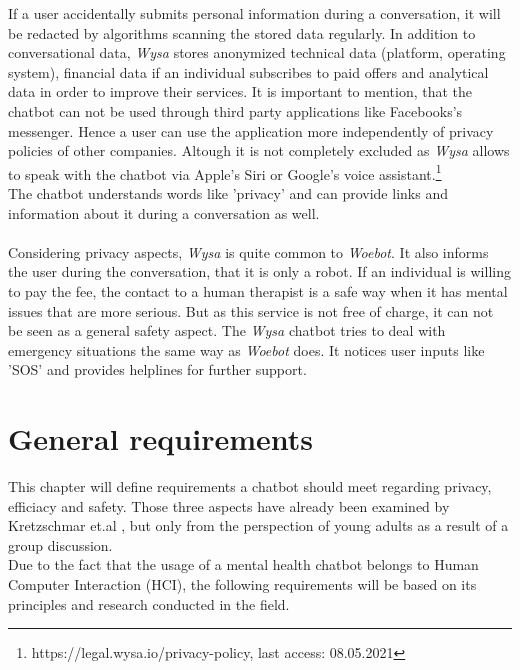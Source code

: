 \documentclass[sigconf, nonacm]{acmart}
\begin{document}
If a user accidentally submits personal information during a conversation, it will be redacted by algorithms scanning the stored data regularly. In addition to conversational data, \emph{Wysa} stores anonymized technical data (platform, operating system), 
financial data if an individual subscribes to paid offers and analytical data in order to improve their services. 
It is important to mention, that the chatbot can not be used through third party applications like Facebooks's messenger. Hence a user can use the application more independently of privacy policies of other companies. Altough it is not completely excluded as \emph{Wysa} allows to speak with the chatbot 
via Apple's Siri or Google's voice assistant.\footnote{https://legal.wysa.io/privacy-policy, last access: 08.05.2021}
\\
The chatbot understands words like 'privacy' and can provide links and information about it during a conversation as well.\cite{Kretzschmar2019}
\\\\
Considering privacy aspects, \emph{Wysa} is quite common to \emph{Woebot}. It also informs the user during the conversation, that it is only a robot. If an individual is willing to pay the fee, the contact to a human therapist is a safe way when it has mental issues that are 
more serious. But as this service is not free of charge, it can not be seen as a general safety aspect. The \emph{Wysa} chatbot tries to deal with emergency situations the same way as \emph{Woebot} does. It notices user inputs like 'SOS' and provides helplines for further support.\cite{Kretzschmar2019}
\section{General requirements}
This chapter will define requirements a chatbot should meet regarding privacy, efficiacy and safety. Those three aspects have already been examined by Kretzschmar et.al \cite{Kretzschmar2019}, but only from the perspection of young adults as a result of a group discussion.
\\
Due to the fact that the usage of a mental health chatbot belongs to Human Computer Interaction (HCI), the following requirements will be based on its principles and research conducted in the field.
\end{document}

